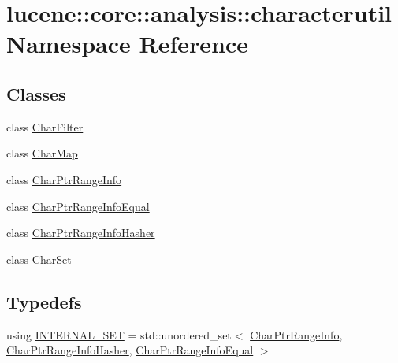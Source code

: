 \hypertarget{namespacelucene_1_1core_1_1analysis_1_1characterutil}{}\section{lucene\+:\+:core\+:\+:analysis\+:\+:characterutil Namespace Reference}
\label{namespacelucene_1_1core_1_1analysis_1_1characterutil}
\subsection*{Classes}
\begin{DoxyCompactItemize}
\item 
class \mbox{\hyperlink{classlucene_1_1core_1_1analysis_1_1characterutil_1_1CharFilter}{Char\+Filter}}
\item 
class \mbox{\hyperlink{classlucene_1_1core_1_1analysis_1_1characterutil_1_1CharMap}{Char\+Map}}
\item 
class \mbox{\hyperlink{classlucene_1_1core_1_1analysis_1_1characterutil_1_1CharPtrRangeInfo}{Char\+Ptr\+Range\+Info}}
\item 
class \mbox{\hyperlink{classlucene_1_1core_1_1analysis_1_1characterutil_1_1CharPtrRangeInfoEqual}{Char\+Ptr\+Range\+Info\+Equal}}
\item 
class \mbox{\hyperlink{classlucene_1_1core_1_1analysis_1_1characterutil_1_1CharPtrRangeInfoHasher}{Char\+Ptr\+Range\+Info\+Hasher}}
\item 
class \mbox{\hyperlink{classlucene_1_1core_1_1analysis_1_1characterutil_1_1CharSet}{Char\+Set}}
\end{DoxyCompactItemize}
\subsection*{Typedefs}
\begin{DoxyCompactItemize}
\item 
using \mbox{\hyperlink{namespacelucene_1_1core_1_1analysis_1_1characterutil_a2b64bd3cca4a8e9112fcbfaebc68aeee}{I\+N\+T\+E\+R\+N\+A\+L\+\_\+\+S\+ET}} = std\+::unordered\+\_\+set$<$ \mbox{\hyperlink{classlucene_1_1core_1_1analysis_1_1characterutil_1_1CharPtrRangeInfo}{Char\+Ptr\+Range\+Info}}, \mbox{\hyperlink{classlucene_1_1core_1_1analysis_1_1characterutil_1_1CharPtrRangeInfoHasher}{Char\+Ptr\+Range\+Info\+Hasher}}, \mbox{\hyperlink{classlucene_1_1core_1_1analysis_1_1characterutil_1_1CharPtrRangeInfoEqual}{Char\+Ptr\+Range\+Info\+Equal}} $>$
\end{DoxyCompactItemize}
